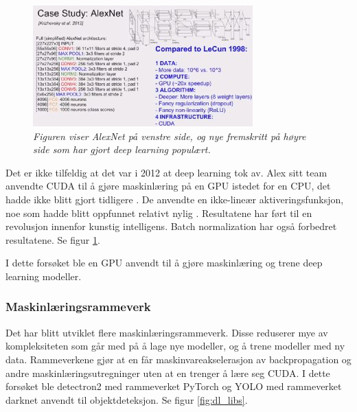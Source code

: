\begin{figure}[t]
\begin{center} 
\includegraphics[scale=1.0]{figures/comparison}
\caption{\small \sl Figuren viser AlexNet på venstre side, og nye fremskritt på høyre side som har gjort deep learning populært. \cite{Karpathy 2014} \label{fig:comparison}}
\end{center} 
\end{figure} 

Det er ikke tilfeldig at det var i 2012 at deep learning tok av. Alex sitt team anvendte CUDA til å gjøre maskinlæring på en GPU istedet for en CPU, det hadde ikke blitt gjort tidligere \cite{Krizhevsky m.fl. 2012}. De anvendte en ikke-lineær aktiveringsfunksjon, noe som hadde blitt oppfunnet relativt nylig \cite{LeCun m.fl. 1998 s. 3}. Resultatene har ført til en revolusjon innenfor kunstig intelligens. Batch normalization har også forbedret resultatene. Se figur \ref{fig:comparison}. \cite{Ioffe og Szegedy 2015 s. 1}

I dette forsøket ble en GPU anvendt til å gjøre maskinlæring og trene deep learning modeller.

\subsubsection{Maskinlæringsrammeverk}

Det har blitt utviklet flere maskinlæringsrammeverk. Disse reduserer mye av kompleksiteten som går med på å lage nye modeller, og å trene modeller med ny data. Rammeverkene gjør at en får maskinvareakselerasjon av backpropagation og andre maskinlæringsutregninger uten at en trenger å lære seg CUDA. I dette forsøket ble detectron2 med rammeverket PyTorch og YOLO med rammeverket darknet anvendt til objektdeteksjon. Se figur \ref{fig:dl_libs}.


